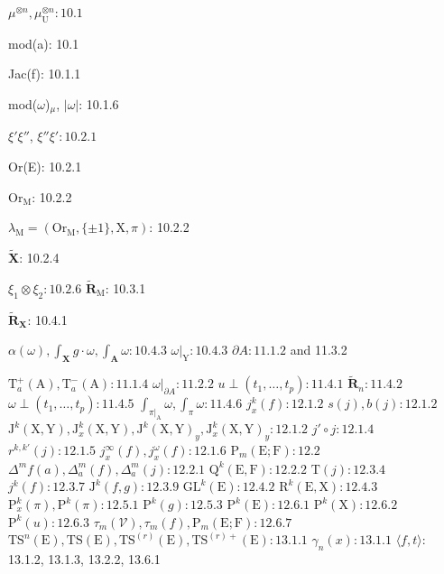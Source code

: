 \(\mu^{\otimes n}, \mu_{\mathrm{U}}^{\otimes n}: 10.1\)

mod(a): 10.1

Jac(f): 10.1.1

mod(\(\omega\))\(_{\mu}\), \(|\omega|\): 10.1.6

\(\xi'\xi''\), \(\xi''\xi': 10.2.1\)

Or(E): 10.2.1

\(\mathrm{Or}_{\mathrm{M}}\): 10.2.2

\(\lambda_{\mathrm{M}} = (\mathrm{Or}_{\mathrm{M}}, \{\pm 1\}, \mathrm{X}, \pi)\): 10.2.2

\(\tilde{\mathbf{X}}\): 10.2.4

\(\xi_1 \otimes \xi_2: 10.2.6\) \(\tilde{\mathbf{R}}_{\mathrm{M}}\): 10.3.1

\(\tilde{\mathbf{R}}_{\mathbf{X}}\): 10.4.1

\(\alpha(\omega), \int_{\mathbf{X}} g \cdot \omega, \int_{\mathbf{A}} \omega: 10.4.3\) \(\omega|_{\mathrm{Y}}: 10.4.3\) \(\partial A: 11.1.2\) and 11.3.2

\(\mathrm{T}_a^+(\mathrm{A}), \mathrm{T}_a^-(\mathrm{A}): 11.1.4\) \(\omega|_{\partial A}: 11.2.2\) \(u \perp (t_1, \ldots, t_p): 11.4.1\) \(\tilde{\mathbf{R}}_n: 11.4.2\) \(\omega \perp (t_1, \ldots, t_p): 11.4.5\) \(\int_{\pi|_{\mathrm{A}}} \omega, \int_{\pi} \omega: 11.4.6\) \(j_x^k(f): 12.1.2\) \(s(j), b(j): 12.1.2\) \(\mathrm{J}^k(\mathrm{X}, \mathrm{Y}), \mathrm{J}_x^k(\mathrm{X}, \mathrm{Y}), \mathrm{J}^k(\mathrm{X}, \mathrm{Y})_y, \mathrm{J}_x^k(\mathrm{X}, \mathrm{Y})_y: 12.1.2\) \(j' \circ j: 12.1.4\) \(r^{k, k'}(j): 12.1.5\) \(j_x^\infty(f), j_x^\omega(f): 12.1.6\) \(\mathrm{P}_m(\mathrm{E}; \mathrm{F}): 12.2\) \(\Delta^m f(a), \Delta_a^m(f), \Delta_a^m(j): 12.2.1\) \(\mathrm{Q}^k(\mathrm{E}, \mathrm{F}): 12.2.2\) \(\mathrm{T}(j): 12.3.4\) \(j^k(f): 12.3.7\) \(\mathrm{J}^k(f, g): 12.3.9\) \(\mathrm{GL}^k(\mathrm{E}): 12.4.2\) \(\mathrm{R}^k(\mathrm{E}, \mathrm{X}): 12.4.3\) \(\mathrm{P}_x^k(\pi), \mathrm{P}^k(\pi): 12.5.1\) \(\mathrm{P}^k(g): 12.5.3\) \(\mathrm{P}^k(\mathrm{E}): 12.6.1\) \(\mathrm{P}^k(\mathrm{X}): 12.6.2\) \(\mathrm{P}^k(u): 12.6.3\) \(\tau_m(\mathcal{V}), \tau_m(f), \mathrm{P}_m(\mathrm{E}; \mathrm{F}): 12.6.7\) \(\mathrm{TS}^n(\mathrm{E}), \mathrm{TS}(\mathrm{E}), \mathrm{TS}^{(r)}(\mathrm{E}), \mathrm{TS}^{(r)+}(\mathrm{E}): 13.1.1\) \(\gamma_n(x): 13.1.1\) \(\langle f, t\rangle\): 13.1.2, 13.1.3, 13.2.2, 13.6.1

